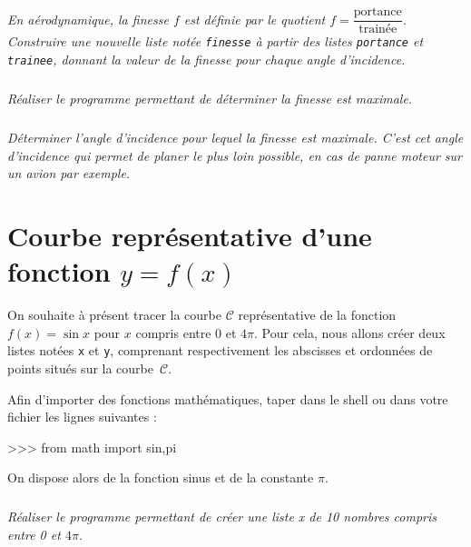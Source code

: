 \documentclass[10pt]{article}
\begin{document}
\subparagraph{}
\textit{En aérodynamique, la finesse $f$ est définie par le quotient $f=\dfrac{\text{portance}}{\text{trainée}}$. Construire une nouvelle liste notée \texttt{finesse} à partir des listes \texttt{portance} et \texttt{trainee}, donnant la valeur de la finesse pour chaque angle d'incidence.}

\subparagraph{}
\textit{Réaliser le programme permettant de déterminer la finesse est maximale.}

\subparagraph{}
\textit{Déterminer l'angle d'incidence pour lequel la finesse est maximale.
  C'est cet angle d'incidence qui permet de planer le plus loin possible, en cas de panne moteur sur un avion par exemple.}




\section{Courbe représentative d'une fonction $y=f(x)$}
\setcounter{subparagraph}{0}
On souhaite à présent tracer la courbe $\mathcal{C}$ représentative de la fonction $f(x)=\sin x$ pour $x$ compris entre 0 et $4\pi$. Pour cela, nous allons créer deux listes notées \texttt{x} et \texttt{y}, comprenant respectivement les abscisses et ordonnées de points situés sur la courbe~$\mathcal{C}$.



\begin{py}
Afin d'importer des fonctions mathématiques, taper dans le shell ou dans votre fichier les lignes suivantes : 
\begin{python}
>>> from math import sin,pi
\end{python}

On dispose alors de la fonction sinus et de la constante $\pi$.
\end{py}


\subparagraph{}
\textit{Réaliser le programme permettant de créer une liste \textsl{x} de 10 nombres compris entre 0 et $4\pi$.}


\end{document}
